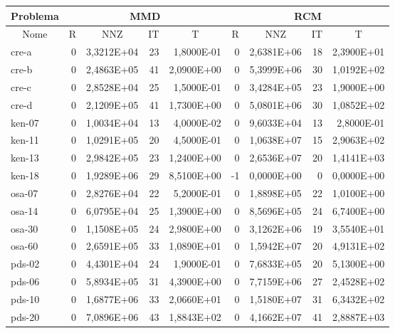 \begin{tabular}{|l|r|r|r|r|r|r|r|r|}
\hline
\multicolumn{1}{|c|}{Problema} & \multicolumn{4}{|c|}{MMD} &         \multicolumn{4}{|c|}{RCM} \\ \hline
\multicolumn{1}{|c|}{Nome} & \multicolumn{1}{|c|}{R} &
        \multicolumn{1}{|c|}{NNZ} & \multicolumn{1}{|c|}{IT} &
        \multicolumn{1}{|c|}{T} & \multicolumn{1}{|c|}{R} &
        \multicolumn{1}{|c|}{NNZ} & \multicolumn{1}{|c|}{IT} &
        \multicolumn{1}{|c|}{T} \\ \hline
cre-a & 0 & 3,3212E+04 & 23 & 1,8000E-01 & 0 & 2,6381E+06 & 18 & 2,3900E+01 \\ \hline
cre-b & 0 & 2,4863E+05 & 41 & 2,0900E+00 & 0 & 5,3999E+06 & 30 & 1,0192E+02 \\ \hline
cre-c & 0 & 2,8528E+04 & 25 & 1,5000E-01 & 0 & 3,4284E+05 & 23 & 1,9000E+00 \\ \hline
cre-d & 0 & 2,1209E+05 & 41 & 1,7300E+00 & 0 & 5,0801E+06 & 30 & 1,0852E+02 \\ \hline
ken-07 & 0 & 1,0034E+04 & 13 & 4,0000E-02 & 0 & 9,6033E+04 & 13 & 2,8000E-01 \\ \hline
ken-11 & 0 & 1,0291E+05 & 20 & 4,5000E-01 & 0 & 1,0638E+07 & 15 & 2,9063E+02 \\ \hline
ken-13 & 0 & 2,9842E+05 & 23 & 1,2400E+00 & 0 & 2,6536E+07 & 20 & 1,4141E+03 \\ \hline
ken-18 & 0 & 1,9289E+06 & 29 & 8,5100E+00 & -1 & 0,0000E+00 & 0 & 0,0000E+00 \\ \hline
osa-07 & 0 & 2,8276E+04 & 22 & 5,2000E-01 & 0 & 1,8898E+05 & 22 & 1,0100E+00 \\ \hline
osa-14 & 0 & 6,0795E+04 & 25 & 1,3900E+00 & 0 & 8,5696E+05 & 24 & 6,7400E+00 \\ \hline
osa-30 & 0 & 1,1508E+05 & 24 & 2,9800E+00 & 0 & 3,1262E+06 & 19 & 3,5540E+01 \\ \hline
osa-60 & 0 & 2,6591E+05 & 33 & 1,0890E+01 & 0 & 1,5942E+07 & 20 & 4,9131E+02 \\ \hline
pds-02 & 0 & 4,4301E+04 & 24 & 1,9000E-01 & 0 & 7,6833E+05 & 20 & 5,1300E+00 \\ \hline
pds-06 & 0 & 5,8934E+05 & 31 & 4,3900E+00 & 0 & 7,7159E+06 & 27 & 2,4528E+02 \\ \hline
pds-10 & 0 & 1,6877E+06 & 33 & 2,0660E+01 & 0 & 1,5180E+07 & 31 & 6,3432E+02 \\ \hline
pds-20 & 0 & 7,0896E+06 & 43 & 1,8843E+02 & 0 & 4,1662E+07 & 41 & 2,8887E+03 \\ \hline
\end{tabular}
